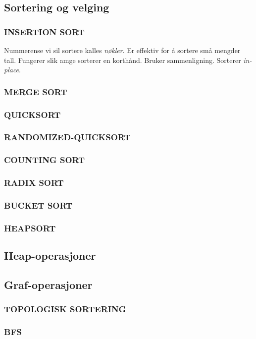 \subsection{Sortering og velging}
\subsubsection{INSERTION SORT}
Nummerense vi sil sortere kalles \textit{nøkler}. Er effektiv for å sortere små mengder tall. Fungerer slik amge sorterer en korthånd. Bruker sammenligning. Sorterer \textit{in-place}.
\subsubsection{MERGE SORT}
\subsubsection{QUICKSORT}
\subsubsection{RANDOMIZED-QUICKSORT}
\subsubsection{COUNTING SORT}
\subsubsection{RADIX SORT}
\subsubsection{BUCKET SORT}
\subsubsection{HEAPSORT}
\subsection{Heap-operasjoner}
\subsection{Graf-operasjoner}
\subsubsection{TOPOLOGISK SORTERING}
\subsubsection{BFS}
